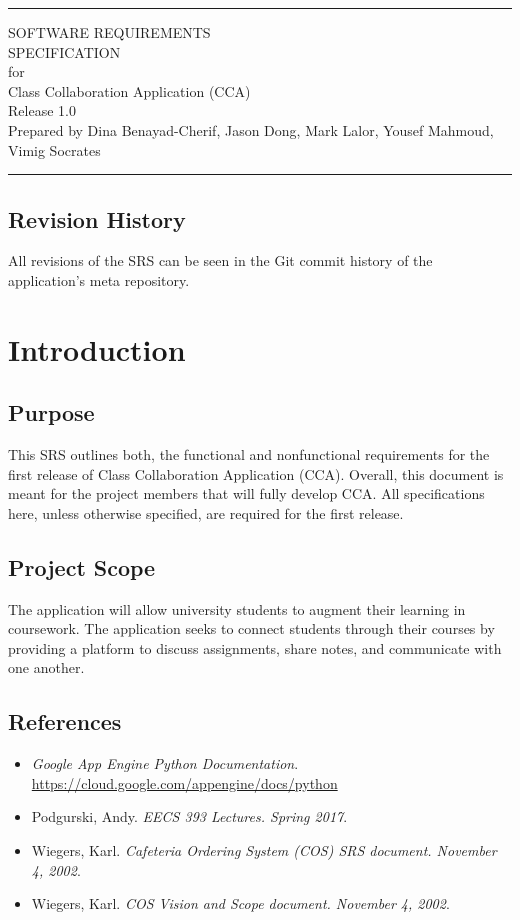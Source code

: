 \documentclass{scrreprt}
\date{}
\begin{document}
\begin{flushright}
	\rule{16cm}{5pt}\vskip1cm
	\Huge{SOFTWARE REQUIREMENTS\\ SPECIFICATION}\\
	\vspace{2cm}
	for\\
	\vspace{2cm}
	Class Collaboration Application (CCA)\\
	\vspace{2cm}
	\LARGE{Release 1.0\\}
	\vspace{2cm}
	Prepared by Dina Benayad-Cherif, Jason Dong, Mark Lalor, Yousef Mahmoud, Vimig Socrates\\
	\vfill
	\rule{16cm}{5pt}
\end{flushright}

\tableofcontents

\section*{Revision History}
All revisions of the SRS can be seen in the Git commit history of the application's meta repository.

\chapter{Introduction}
\section{Purpose}
This SRS outlines both, the functional and nonfunctional requirements for the first release of Class Collaboration Application (CCA). Overall, this document is meant for the project members that will fully develop CCA. All specifications here, unless otherwise specified, are required for the first release.
\section{Project Scope }
The application will allow university students to augment their learning in coursework. The application seeks to connect students through their courses by providing a platform to discuss assignments, share notes, and communicate with one another.
\section{References}
\begin{itemize}
	\item \textit{Google App Engine Python Documentation}. \\
	\url{https://cloud.google.com/appengine/docs/python}
	\item Podgurski, Andy. \textit{EECS 393 Lectures. Spring 2017}.
	\item Wiegers, Karl. \textit{Cafeteria Ordering System (COS) SRS document. November 4, 2002}.
	\item Wiegers, Karl. \textit{COS Vision and Scope document. November 4, 2002}.
\end{itemize}
\end{document}
